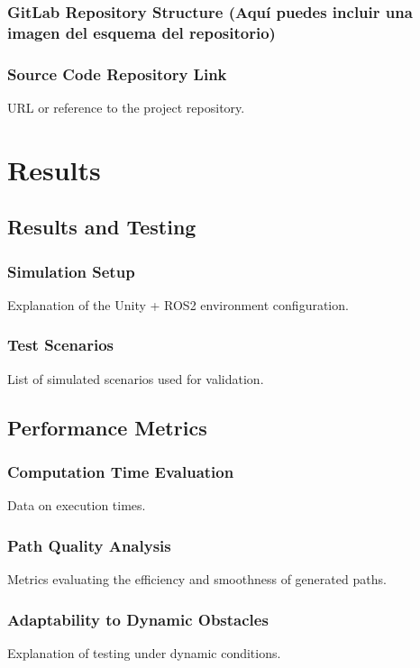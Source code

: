 \documentclass[a4paper,11pt]{report}
\begin{document}
\subsection{GitLab Repository Structure (Aquí puedes incluir una imagen del esquema del repositorio)}

\subsection{Source Code Repository Link}
URL or reference to the project repository.

\newpage

\chapter{Results}
\section{Results and Testing}
\subsection{Simulation Setup}
Explanation of the Unity + ROS2 environment configuration.

\subsection{Test Scenarios}
List of simulated scenarios used for validation.

\section{Performance Metrics}
\subsection{Computation Time Evaluation}
Data on execution times.

\subsection{Path Quality Analysis}
Metrics evaluating the efficiency and smoothness of generated paths.

\subsection{Adaptability to Dynamic Obstacles}
Explanation of testing under dynamic conditions.
\end{document}
